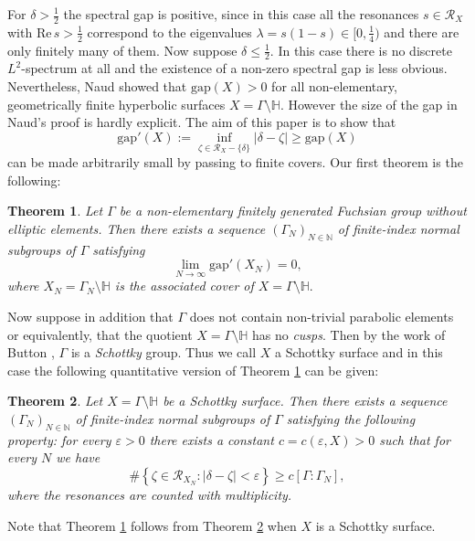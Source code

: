 \documentclass[12pt]{article}
\newtheorem{thm}{Theorem}
\newcommand{\NN}{\mathbb{N}}
\newcommand{\R}{\mathrm{Re}\,}
\newcommand{\HH}{\mathbb{H}}
\begin{document}
For $ \delta > \frac{1}{2} $ the spectral gap is positive, since in this case all the resonances $ s\in \mathcal{R}_{X} $ with $ \R s > \frac{1}{2} $ correspond to the eigenvalues $ \lambda = s(1-s)\in [0, \frac{1}{4}) $ and there are only finitely many of them. Now suppose $ \delta \leq \frac{1}{2} $. In this case there is no discrete $ L^{2} $-spectrum at all and the existence of a non-zero spectral gap is less obvious. Nevertheless, Naud \cite{Naud} showed that $ \mathrm{gap}(X) > 0 $ for all non-elementary, geometrically finite hyperbolic surfaces $ X = \Gamma\setminus \HH $. However the size of the gap in Naud's proof is hardly explicit. The aim of this paper is to show that
$$ \mathrm{gap}'(X) := \inf_{\zeta\in \mathcal{R}_{X}-\{ \delta \}} \vert\delta-  \zeta\vert \geq  \mathrm{gap}(X) $$ 
can be made arbitrarily small by passing to finite covers. Our first theorem is the following:

\begin{thm}\label{First Main Theorem}
Let $ \Gamma $ be a non-elementary finitely generated Fuchsian group without elliptic elements. Then there exists a sequence $ (\Gamma_{N})_{N\in \NN} $ of finite-index normal subgroups of $ \Gamma $ satisfying
$$ \underset{N\to \infty}{\lim} \mathrm{gap}'(X_{N})=0, $$
where $ X_{N} = \Gamma_{N}\setminus \HH $ is the associated cover of $ X = \Gamma\setminus \HH. $
\end{thm}

Now suppose in addition that $ \Gamma $ does not contain non-trivial parabolic elements or equivalently, that the quotient $ X= \Gamma\setminus \HH $ has no \textit{cusps}. Then by the work of Button \cite{Button}, $ \Gamma $ is a \textit{Schottky} group. Thus we call $ X $ a Schottky surface and in this case the following quantitative version of Theorem \ref{First Main Theorem} can be given:

\begin{thm}\label{main theorem}
Let $ X = \Gamma\setminus \HH $ be a Schottky surface. Then there exists a sequence $ (\Gamma_{N})_{N\in \NN} $ of finite-index normal subgroups of $ \Gamma $ satisfying the following property: for every $ \varepsilon > 0 $ there exists a constant $ c=c(\varepsilon, X) > 0 $ such that for every $ N $ we have 
$$ \# \left\{ \zeta\in \mathcal{R}_{X_{N}} : \vert \delta-\zeta \vert < \varepsilon \right\} \geq c [\Gamma:\Gamma_{N}], $$
where the resonances are counted with multiplicity.
\end{thm}

Note that Theorem \ref{First Main Theorem}
follows from Theorem \ref{main theorem} when $ X $ is a Schottky surface.
\end{document}
